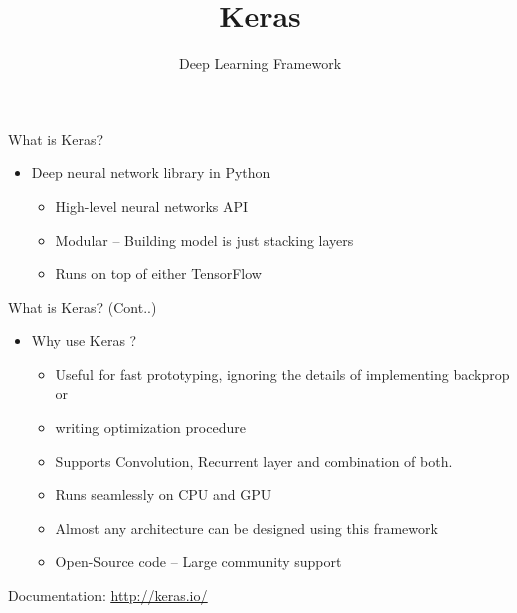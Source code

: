 \documentclass[aspectratio=169,14pt,usenames,dvipsnames]{beamer}
\title[Keras]{Keras}
\begin{document}
{\1
\begin{frame} \vspace{35pt}
	\subtitle{Deep Learning Framework}
	\maketitle
\end{frame}
}


\begin{frame}{What is Keras?}

\begin{itemize}
\item Deep neural network library in Python
\begin{itemize}
\item High-level neural networks API
\item Modular – Building model is just stacking layers 
\item Runs on top of either TensorFlow
\end{itemize}
\end{itemize}
\end{frame}

\begin{frame}{What is Keras? (Cont..)}
\begin{itemize}
\item Why use Keras ?

\begin{itemize}
\item Useful for fast prototyping, ignoring the details of implementing backprop or
\item writing optimization procedure
\item Supports Convolution, Recurrent layer and combination of both.
\item Runs seamlessly on CPU and GPU
\item Almost any architecture can be designed using this framework
\item Open-Source code – Large community support

\end{itemize}
\end{itemize}

Documentation: \underline{\url{http://keras.io/}}

\end{frame}
\end{document}
